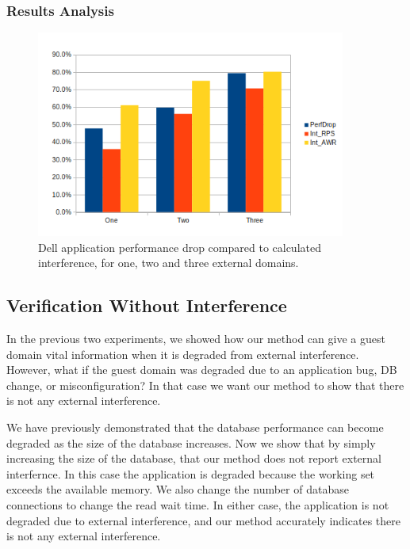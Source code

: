\subsubsection{Results Analysis}
\begin{figure}[!h]
  \begin{center}
  \includegraphics[width=4in]{images/Dell_PerfDrop_Int.png}
  \caption{Dell application performance drop compared to calculated interference, for one, two and three external domains.}
  \label{fig:perfDropDell}
  \end{center}
\end{figure}


\subsection{Verification Without Interference}
In the previous two experiments, we showed how our method can give a guest domain vital information when it is degraded from external interference.  However, what if the guest domain was degraded due to an application bug, DB change, or misconfiguration?   In that case we want our method to show that there is not any external interference.

We have previously demonstrated that the database performance can become degraded as the size of the database increases.  Now we show that by simply increasing the size of the database, that our method does not report external interfernce.  In this case the application is degraded because the working set exceeds the available memory.  We also change the number of database connections to change the read wait time.  In either case, the application is not degraded due to external interference, and our method accurately indicates there is not any external interference.

